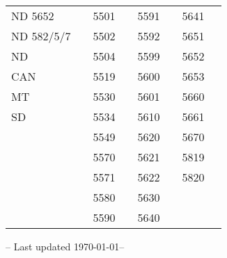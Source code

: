 \documentclass{article}
\begin{document}
\begin{table}
\centering
\HUGE
\caption*{}
\begin{tabular}{@{}llllllll@{}}
\toprule
ND 5652    & \cellcolor{green}  & 5501 & \cellcolor{yellow} & 5591 & \cellcolor{yellow} & 5641 & \cellcolor{yellow} \\
ND 582/5/7 & \cellcolor{blue}   & 5502 & \cellcolor{purple} & 5592 & \cellcolor{yellow} & 5651 & \cellcolor{blue}   \\
ND         & \cellcolor{grey}   & 5504 & \cellcolor{yellow} & 5599 & \cellcolor{orange} & 5652 & \cellcolor{green}  \\
CAN        & \cellcolor{blue}   & 5519 & \cellcolor{grey}   & 5600 & \cellcolor{blue}   & 5653 & \cellcolor{green}  \\
MT         & \cellcolor{grey}   & 5530 & \cellcolor{purple} & 5601 & \cellcolor{blue}   & 5660 & \cellcolor{green}  \\
SD         & \cellcolor{purple} & 5534 & \cellcolor{purple} & 5610 & \cellcolor{blue}   & 5661 & \cellcolor{green}  \\
           &                    & 5549 & \cellcolor{red}    & 5620 & \cellcolor{yellow} & 5670 & \cellcolor{blue}   \\
           &                    & 5570 & \cellcolor{green}  & 5621 & \cellcolor{purple} & 5819 & \cellcolor{blue}   \\
           &                    & 5571 & \cellcolor{green}  & 5622 & \cellcolor{blue}   & 5820 & \cellcolor{blue}   \\
           &                    & 5580 & \cellcolor{green}  & 5630 & \cellcolor{blue}   &      &                    \\
           &                    & 5590 & \cellcolor{yellow} & 5640 & \cellcolor{blue}   &      &                    \\ \bottomrule
\end{tabular}
\end{table}
\LARGE
-- Last updated \today --
\end{document}
